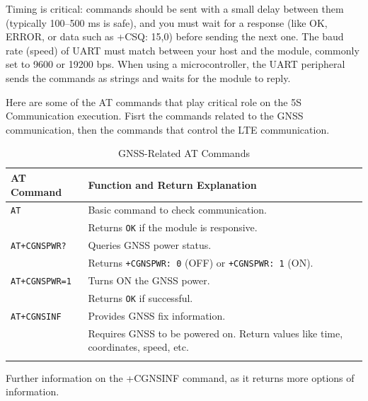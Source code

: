 Timing is critical: commands should be sent with a small delay between them (typically 100–500 ms is safe), 
and you must wait for a response (like OK, ERROR, or data such as +CSQ: 15,0) before sending the next one. 
The baud rate (speed) of UART must match between your host and the module, commonly set to 9600 or 19200 bps. 
When using a microcontroller, the UART peripheral sends the commands as strings and waits for the module to 
reply.

Here are some of the AT commands that play critical role on the 5S Communication execution. Fisrt the commands
related to the GNSS communication, then the commands that control the LTE communication.

\begin{table}[h!]
    \centering
    \small
    \begin{tabular}{l|l}
        \textbf{AT Command} & \textbf{Function and Return Explanation} \\
        \hline
        \arrayrulecolor[gray]{0.85}
        \texttt{AT} & Basic command to check communication.\\ 
        & Returns \texttt{OK} if the module is responsive. \\
        \hline
        \texttt{AT+CGNSPWR?} & Queries GNSS power status.\\ 
        & Returns \texttt{+CGNSPWR: 0} (OFF) or \texttt{+CGNSPWR: 1} (ON). \\
        \hline
        \texttt{AT+CGNSPWR=1} & Turns ON the GNSS power. \\ 
        & Returns \texttt{OK} if successful. \\
        \hline
        \texttt{AT+CGNSINF} & Provides GNSS fix information.\\ 
        & Requires GNSS to be powered on. Return values like time, coordinates, speed, etc. \\
        \arrayrulecolor{black}
    \end{tabular}
    \caption{GNSS-Related AT Commands}
\end{table}

Further information on the +CGNSINF command, as it returns more options of information.

